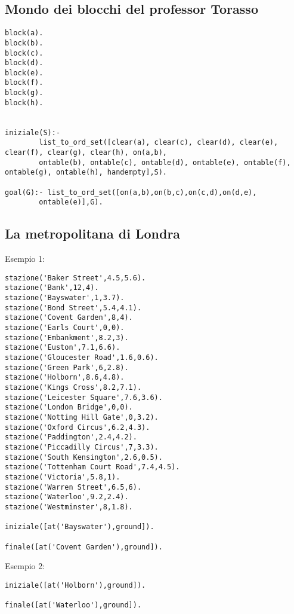 \subsection{Mondo dei blocchi del professor Torasso}

\begin{lstlisting}
block(a).
block(b).
block(c).
block(d).
block(e).
block(f).
block(g).
block(h).


iniziale(S):-
        list_to_ord_set([clear(a), clear(c), clear(d), clear(e), clear(f), clear(g), clear(h), on(a,b),
        ontable(b), ontable(c), ontable(d), ontable(e), ontable(f), ontable(g), ontable(h), handempty],S).

goal(G):- list_to_ord_set([on(a,b),on(b,c),on(c,d),on(d,e),
        ontable(e)],G).
\end{lstlisting}

\subsection{La metropolitana di Londra}

Esempio 1:

\begin{lstlisting}
stazione('Baker Street',4.5,5.6).
stazione('Bank',12,4).
stazione('Bayswater',1,3.7).
stazione('Bond Street',5.4,4.1).
stazione('Covent Garden',8,4).
stazione('Earls Court',0,0).
stazione('Embankment',8.2,3).
stazione('Euston',7.1,6.6).
stazione('Gloucester Road',1.6,0.6).
stazione('Green Park',6,2.8).
stazione('Holborn',8.6,4.8).
stazione('Kings Cross',8.2,7.1).
stazione('Leicester Square',7.6,3.6).
stazione('London Bridge',0,0).
stazione('Notting Hill Gate',0,3.2).
stazione('Oxford Circus',6.2,4.3).
stazione('Paddington',2.4,4.2).
stazione('Piccadilly Circus',7,3.3).
stazione('South Kensington',2.6,0.5).
stazione('Tottenham Court Road',7.4,4.5).
stazione('Victoria',5.8,1).
stazione('Warren Street',6.5,6).
stazione('Waterloo',9.2,2.4).
stazione('Westminster',8,1.8).

iniziale([at('Bayswater'),ground]).

finale([at('Covent Garden'),ground]).
\end{lstlisting}

Esempio 2:

\begin{lstlisting}
iniziale([at('Holborn'),ground]).

finale([at('Waterloo'),ground]).
\end{lstlisting}